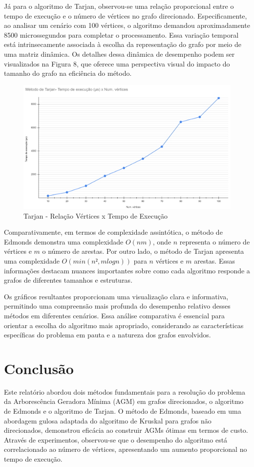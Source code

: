 \documentclass[12pt]{article}
\begin{document}
Já para o algoritmo de Tarjan, observou-se uma relação proporcional entre o tempo de execução e o número de vértices no grafo direcionado. Especificamente, ao analisar um cenário com 100 vértices, o algoritmo demandou aproximadamente 8500 microssegundos para completar o processamento. Essa variação temporal está intrinsecamente associada à escolha da representação do grafo por meio de uma matriz dinâmica. Os detalhes dessa dinâmica de desempenho podem ser visualizados na Figura 8, que oferece uma perspectiva visual do impacto do tamanho do grafo na eficiência do método.

\begin{figure}[ht]
\centering
\includegraphics[width=.7\textwidth]{AGM/grafico2.png}
\caption{Tarjan - Relação Vértices x Tempo de Execução}
\end{figure}

Comparativamente, em termos de complexidade assintótica, o método de Edmonds demonstra uma complexidade \(O(nm)\), onde \(n\) representa o número de vértices e \(m\) o número de arestas. Por outro lado, o método de Tarjan apresenta uma complexidade \(O(min(n², mlogn))\) para \(n\) vértices e \(m\) arestas. Essas informações destacam nuances importantes sobre como cada algoritmo responde a grafos de diferentes tamanhos e estruturas.

Os gráficos resultantes proporcionam uma visualização clara e informativa, permitindo uma compreensão mais profunda do desempenho relativo desses métodos em diferentes cenários. Essa análise comparativa é essencial para orientar a escolha do algoritmo mais apropriado, considerando as características específicas do problema em pauta e a natureza dos grafos envolvidos.

\section{Conclusão}

Este relatório abordou dois métodos fundamentais para a resolução do problema da Arborescência Geradora Mínima (AGM) em grafos direcionados, o algoritmo de Edmonds e o algoritmo de Tarjan. O método de Edmonds, baseado em uma abordagem gulosa adaptada do algoritmo de Kruskal para grafos não direcionados, demonstrou eficácia ao construir AGMs ótimas em termos de custo. Através de experimentos, observou-se que o desempenho do algoritmo está correlacionado ao número de vértices, apresentando um aumento proporcional no tempo de execução.
\end{document}
